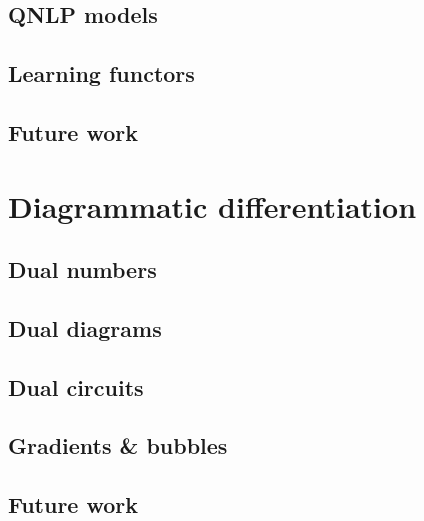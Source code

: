\section{QNLP models}
\section{Learning functors}
\section{Future work}

\chapter{Diagrammatic differentiation} \label{chapter-3:diag-diff}

\section{Dual numbers}
\section{Dual diagrams}
\section{Dual circuits}
\section{Gradients \& bubbles}
\section{Future work}

\setlength{\baselineskip}{0pt} %

{\renewcommand*\MakeUppercase[1]{#1}%
\printbibliography[heading=bibintoc,title=References]}


